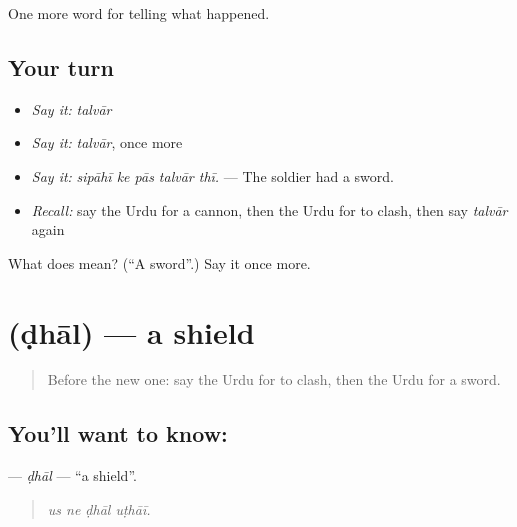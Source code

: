 \begin{grammarlens}[title={What you've built}]
One more word for telling what happened.
\end{grammarlens}

\subsection*{Your turn}
\begin{itemize}
\raggedright
  \item \emph{Say it:} \emph{talvār}
  \item \emph{Say it:} \emph{talvār}, once more
  \item \emph{Say it:} \emph{sipāhī ke pās talvār thī.} — The soldier had a sword.
  \item \emph{Recall:} say the Urdu for a cannon, then the Urdu for to clash, then say \emph{talvār} again
\end{itemize}

\begin{tcolorbox}[breakable,colback=teal!4,colframe=teal!35!black,title={Before you move on}]
What does  mean? (\textquotedblleft{}A sword\textquotedblright{}.) Say it once more.
\end{tcolorbox}
\section[\texorpdfstring{\ur{ڈھال} (ḍhāl)}{ڈھال (ḍhāl)}]{ (ḍhāl) — a shield}

\label{lesson:UR-C310-dhal}



\begin{quote}
Before the new one: say the Urdu for to clash, then the Urdu for a sword.
\end{quote}

\subsection*{You'll want to know: }
\textbf{} — \emph{ḍhāl} — \textquotedblleft{}a shield\textquotedblright{}.

\begin{quote}
   
\end{quote}

\begin{quote}
\emph{us ne ḍhāl uṭhāī.}
\end{quote}


